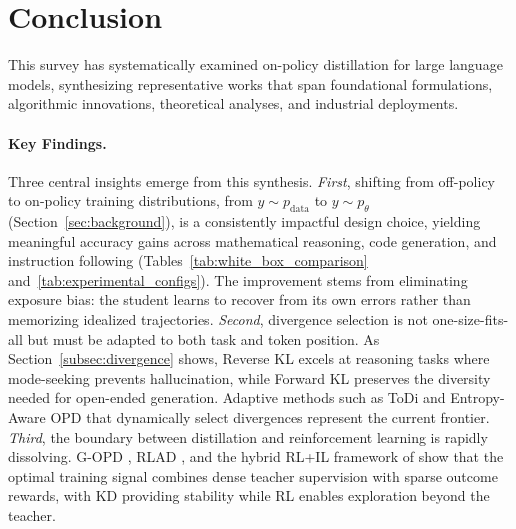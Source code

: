 \documentclass{article} %
\newcommand{\ptheta}{p_\theta}
\newcommand{\pdata}{p_{\mathrm{data}}}
\begin{document}
\section{Conclusion}
\label{sec:conclusion}

This survey has systematically examined on-policy distillation for large language models, synthesizing representative works that span foundational formulations, algorithmic innovations, theoretical analyses, and industrial deployments.

\paragraph{Key Findings.} Three central insights emerge from this synthesis. \emph{First}, shifting from off-policy to on-policy training distributions, from $y \sim \pdata$ to $y \sim \ptheta$ (Section~\ref{sec:background}), is a consistently impactful design choice, yielding meaningful accuracy gains across mathematical reasoning, code generation, and instruction following (Tables~\ref{tab:white_box_comparison} and~\ref{tab:experimental_configs}). The improvement stems from eliminating exposure bias: the student learns to recover from its own errors rather than memorizing idealized trajectories. \emph{Second}, divergence selection is not one-size-fits-all but must be adapted to both task and token position. As Section~\ref{subsec:divergence} shows, Reverse KL excels at reasoning tasks where mode-seeking prevents hallucination, while Forward KL preserves the diversity needed for open-ended generation. Adaptive methods such as ToDi \citep{2505.16297} and Entropy-Aware OPD \citep{2603.07079} that dynamically select divergences represent the current frontier. \emph{Third}, the boundary between distillation and reinforcement learning is rapidly dissolving. G-OPD \citep{2602.12125}, RLAD \citep{2602.22495}, and the hybrid RL+IL framework of \citet{2512.23097} show that the optimal training signal combines dense teacher supervision with sparse outcome rewards, with KD providing stability while RL enables exploration beyond the teacher.
\end{document}
